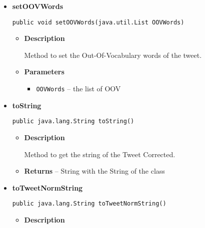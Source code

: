 {{{{{{{{\begin{itemize}
{\begin{itemize}
{Method to set the corrected tweet.
}
\item{
{\bf  Parameters}
  \begin{itemize}
   \item{
\texttt{correctedText} -- the corrected text}
  \end{itemize}
}%
\end{itemize}
}%
\item{ 
\hypertarget{com.jmorenov.tweetsccore.twitter.TweetCorrected.setOOVWords(java.util.List)}{{\bf  setOOVWords}\\}
\begin{lstlisting}[frame=none]
public void setOOVWords(java.util.List OOVWords)\end{lstlisting} %
\begin{itemize}
\item{
{\bf  Description}

Method to set the Out-Of-Vocabulary words of the tweet.
}
\item{
{\bf  Parameters}
  \begin{itemize}
   \item{
\texttt{OOVWords} -- the list of OOV}
  \end{itemize}
}%
\end{itemize}
}%
\item{ 
\hypertarget{com.jmorenov.tweetsccore.twitter.TweetCorrected.toString()}{{\bf  toString}\\}
\begin{lstlisting}[frame=none]
public java.lang.String toString()\end{lstlisting} %
\begin{itemize}
\item{
{\bf  Description}

Method to get the string of the Tweet Corrected.
}
\item{{\bf  Returns} -- 
String with the String of the class 
}%
\end{itemize}
}%
\item{ 
\hypertarget{com.jmorenov.tweetsccore.twitter.TweetCorrected.toTweetNormString()}{{\bf  toTweetNormString}\\}
\begin{lstlisting}[frame=none]
public java.lang.String toTweetNormString()\end{lstlisting} %
\begin{itemize}
\item{
{\bf  Description}

}
\end{itemize}}
\end{itemize}}}}}}}}}
